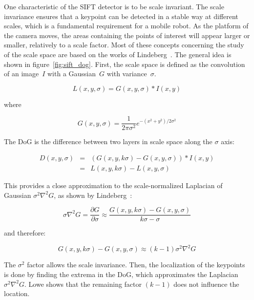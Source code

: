 One characteristic of the SIFT detector is to be scale invariant. The scale invariance ensures that a keypoint can be detected in a stable way at different scales, which is a fundamental requirement for a mobile robot. As the platform of the camera moves, the areas containing the points of interest will appear larger or smaller, relatively to a scale factor. Most of these concepts concerning the study of the scale space are based on the works of Lindeberg~\cite{Lindeberg_1994}. The general idea is shown in figure~\ref{fig:sift_dog}. First, the scale space is defined as the convolution of an image~$I$ with a Gaussian~$G$ with variance~$\sigma$.

\[ L(x,y,\sigma) = G(x,y,\sigma) * I(x,y) \]

where

\[ G(x,y,\sigma) = \frac{1}{2\pi\sigma^2}e^{-{(x^2+y^2)/2\sigma^2}} \]


The \gls{DoG} is the difference between two layers in scale space along the $\sigma$ axis:

\[
\begin{array}{rcl}
D(x,y,\sigma) & = & (G(x,y, k\sigma) - G(x,y,\sigma)) * I(x,y) \\
 & = & L(x,y,k\sigma) - L(x,y,\sigma)
\end{array}
\] 

This provides a close approximation to the scale-normalized Laplacian of Gaussian $\sigma^2\nabla^2G$, as shown by Lindeberg~\cite{Lindeberg_1994}:

\[ \sigma\nabla^2G = \frac{\partial G}{\partial \sigma} \approx \frac{G(x,y,k\sigma)-G(x,y,\sigma)}{k\sigma - \sigma} \]

and therefore:

\[ G(x,y,k\sigma) - G(x,y,\sigma) \approx (k-1)\sigma^2\nabla^2G \]

The $\sigma^2$ factor allows the scale invariance. Then, the localization of the keypoints is done by finding the extrema in the \gls{DoG}, which approximates the Laplacian~$\sigma^2\nabla^2G$. Lowe shows that the remaining factor $(k-1)$ does not influence the location. 

